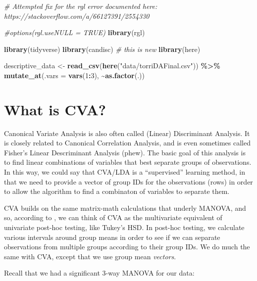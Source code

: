 \documentclass[
]{book}
\newenvironment{Shaded}{\begin{snugshade}}{\end{snugshade}}
\newcommand{\AttributeTok}[1]{\textcolor[rgb]{0.13,0.29,0.53}{#1}}
\newcommand{\CommentTok}[1]{\textcolor[rgb]{0.56,0.35,0.01}{\textit{#1}}}
\newcommand{\DecValTok}[1]{\textcolor[rgb]{0.00,0.00,0.81}{#1}}
\newcommand{\FunctionTok}[1]{\textcolor[rgb]{0.13,0.29,0.53}{\textbf{#1}}}
\newcommand{\NormalTok}[1]{#1}
\newcommand{\OtherTok}[1]{\textcolor[rgb]{0.56,0.35,0.01}{#1}}
\newcommand{\SpecialCharTok}[1]{\textcolor[rgb]{0.81,0.36,0.00}{\textbf{#1}}}
\newcommand{\StringTok}[1]{\textcolor[rgb]{0.31,0.60,0.02}{#1}}
\begin{document}
\begin{Shaded}
\begin{Highlighting}[]
\CommentTok{\# Attempted fix for the rgl error documented here: https://stackoverflow.com/a/66127391/2554330}

\CommentTok{\#options(rgl.useNULL = TRUE)}
\FunctionTok{library}\NormalTok{(rgl)}

\FunctionTok{library}\NormalTok{(tidyverse)}
\FunctionTok{library}\NormalTok{(candisc) }\CommentTok{\# this is new}
\FunctionTok{library}\NormalTok{(here)}

\NormalTok{descriptive\_data }\OtherTok{\textless{}{-}} \FunctionTok{read\_csv}\NormalTok{(}\FunctionTok{here}\NormalTok{(}\StringTok{"data/torriDAFinal.csv"}\NormalTok{)) }\SpecialCharTok{\%\textgreater{}\%}
  \FunctionTok{mutate\_at}\NormalTok{(}\AttributeTok{.vars =} \FunctionTok{vars}\NormalTok{(}\DecValTok{1}\SpecialCharTok{:}\DecValTok{3}\NormalTok{), }\SpecialCharTok{\textasciitilde{}}\FunctionTok{as.factor}\NormalTok{(.))}
\end{Highlighting}
\end{Shaded}

\section{What is CVA?}\label{what-is-cva}

Canonical Variate Analysis is also often called (Linear) Discriminant Analysis. It is closely related to Canonical Correlation Analysis, and is even sometimes called Fisher's Linear Descriminant Analysis (phew). The basic goal of this analysis is to find linear combinations of variables that best separate groups of observations. In this way, we could say that CVA/LDA is a ``supervised'' learning method, in that we need to provide a vector of group IDs for the observations (rows) in order to allow the algorithm to find a combinaton of variables to separate them.

CVA builds on the same matrix-math calculations that underly MANOVA, and so, according to \citet{rencherMethods2002}, we can think of CVA as the multivariate equivalent of univariate post-hoc testing, like Tukey's HSD. In post-hoc testing, we calculate various intervals around group means in order to see if we can separate observations from multiple groups according to their group IDs. We do much the same with CVA, except that we use group mean \emph{vectors}.

Recall that we had a significant 3-way MANOVA for our data:
\end{document}
